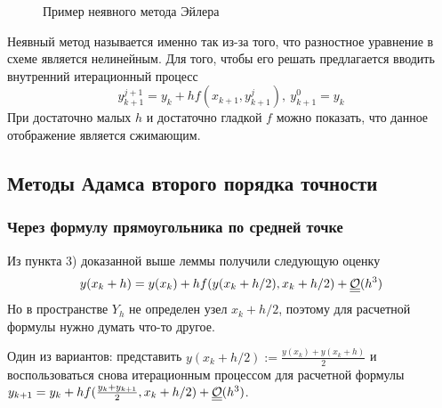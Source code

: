 \begin{figure}[h]
  \centering
  \caption{Пример неявного метода Эйлера}
\end{figure}

Неявный метод называется именно так из-за того, что разностное уравнение
в схеме является нелинейным. Для того, чтобы его решать предлагается
вводить внутренний итерационный процесс
\[y_{k+1}^{j+1}= y_k+hf(x_{k+1},y_{k+1}^{j}),\ y_{k+1}^{0}=y_{k}\]
При достаточно малых $h$ и достаточно гладкой $f$ можно показать,
что данное отображение является сжимающим.

\subsection*{Методы Адамса второго порядка точности}

\subsubsection*{Через формулу прямоугольника по средней точке}
Из пункта 3) доказанной выше леммы получили следующую оценку
\[y(x_k+h)=y(x_k)+hf(y(x_k+h/2), x_k+h/2)+\underline{\underline{\mathcal{O}}}(h^3)\]
Но в пространстве $Y_h$ не определен узел $x_k+h/2$, поэтому
для расчетной формулы нужно думать что-то другое.

Один из вариантов: представить $y(x_k+h/2):=\frac{y(x_k)+y(x_k+h)}{2}$ и
воспользоваться снова итерационным процессом для расчетной
формулы $y_{k+1}=y_{k}+hf(\frac{y_k+y_{k+1}}{2}, x_k+h/2)+\underline{\underline{\mathcal{O}}}(h^3)$.

